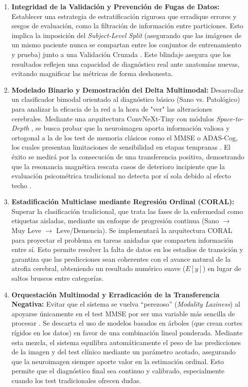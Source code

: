 \documentclass[12pt, oneside, english, spanish]{book}
\begin{document}
\begin{enumerate}
    \item \textbf{Integridad de la Validación y Prevención de Fugas de Datos:} Establecer una estrategia de estratificación rigurosa que erradique errores y sesgos de evaluación, como la filtración de información entre particiones. Esto implica la imposición del \textit{Subject-Level Split} (asegurando que las imágenes de un mismo paciente nunca se compartan entre los conjuntos de entrenamiento y prueba) junto a una Validación Cruzada \cite{wen2020convolutional, yagis2021}. Este blindaje asegura que los resultados reflejen una capacidad de diagnóstico real ante anatomías nuevas, evitando magnificar las métricas de forma deshonesta.

    \item \textbf{Modelado Binario y Demostración del Delta Multimodal:} Desarrollar un clasificador bimodal orientado al diagnóstico básico (Sano vs. Patológico) para analizar la eficacia de la red a la hora de "ver" las alteraciones cerebrales. Mediante una arquitectura ConvNeXt-Tiny \cite{liu2022convnet, basereh2025} con módulos \textit{Space-to-Depth} \cite{sikiric2022no}, se busca probar que la neuroimagen aporta información valiosa y ortogonal a la de los test de memoria clásicos como el MMSE o ADAS-Cog, los cuales presentan limitaciones de sensibilidad en etapas tempranas \cite{tombaugh1992mini}. El éxito se medirá por la consecución de una transferencia positiva, demostrando que la resonancia magnética rescata casos de deterioro incipiente que la evaluación psicométrica tradicional no detecta por sí sola debido al efecto techo \cite{castro2024novel}.

    \item \textbf{Estadificación Multiclase mediante Regresión Ordinal (CORAL):} Superar la clasificación tradicional, que trata las fases de la enfermedad como etiquetas aisladas, mediante un enfoque de progresión continua (Sano $\rightarrow$ Muy Leve $\rightarrow$ Leve/Demencia). Se implementará la arquitectura CORAL \cite{cao2020rank} para proyectar el problema en tareas anidadas que comparten información entre sí. Esto permite resolver la falta de datos en los estadios de transición y garantiza que las predicciones sean coherentes con el avance natural de la atrofia cerebral, obteniendo un resultado numérico suave ($E[y]$) en lugar de saltos bruscos entre categorías.

	\item \textbf{Orquestación Multimodal y Erradicación de la Transferencia Negativa:} Evitar que el sistema se vuelva ``perezoso'' (\textit{Modality Laziness}) al apoyarse únicamente en el test MMSE por ser una variable más sencilla de procesar \cite{javaloy2022}. Se descarta el uso de modelos basados en árboles (que crean cortes rígidos en los datos) en favor de una combinación lineal ponderada. Mediante esta mezcla, el sistema equilibra automáticamente el peso de las predicciones de la imagen y del test clínico mediante un parámetro acotado, asegurando que la neuroimagen siempre aporte valor en la estimación ordinal. Esto permite que el diagnóstico final sea continuo y calibrado, especialmente cuando los test tradicionales ofrecen dudas.
\end{enumerate}
\end{document}
